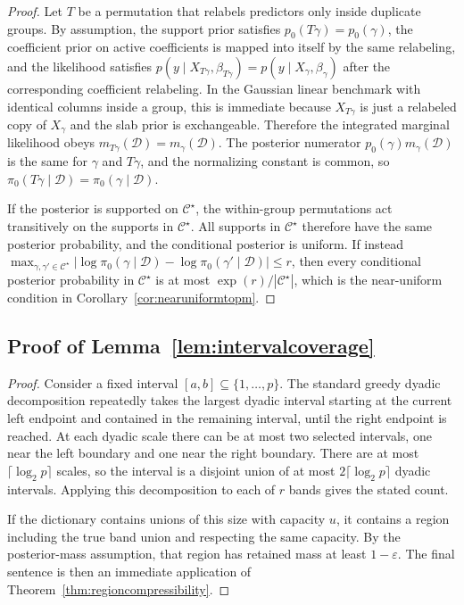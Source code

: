 \documentclass[twoside,11pt]{article}
\newcommand{\D}{\mathcal{D}}
\begin{document}
\begin{proof} Let \(T\) be a permutation that relabels predictors only inside duplicate groups. By assumption, the support prior satisfies \(p_0(T\gamma)=p_0(\gamma)\), the coefficient prior on active coefficients is mapped into itself by the same relabeling, and the likelihood satisfies \(p(y\mid X_{T\gamma},\beta_{T\gamma})=p(y\mid X_\gamma,\beta_\gamma)\) after the corresponding coefficient relabeling. In the Gaussian linear benchmark with identical columns inside a group, this is immediate because \(X_{T\gamma}\) is just a relabeled copy of \(X_\gamma\) and the slab prior is exchangeable. Therefore the integrated marginal likelihood obeys \(m_{T\gamma}(\D)=m_\gamma(\D)\). The posterior numerator \(p_0(\gamma)m_\gamma(\D)\) is the same for \(\gamma\) and \(T\gamma\), and the normalizing constant is common, so \(\pi_0(T\gamma\mid\D)=\pi_0(\gamma\mid\D)\).

If the posterior is supported on \(\mathcal C^\star\), the within-group permutations act transitively on the supports in \(\mathcal C^\star\). All supports in \(\mathcal C^\star\) therefore have the same posterior probability, and the conditional posterior is uniform. If instead \(\max_{\gamma,\gamma'\in\mathcal C^\star}|\log\pi_0(\gamma\mid\D)-\log\pi_0(\gamma'\mid\D)|\le r\), then every conditional posterior probability in \(\mathcal C^\star\) is at most \(\exp(r)/|\mathcal C^\star|\), which is the near-uniform condition in Corollary~\ref{cor:nearuniformtopm}.
\end{proof}

\subsection{Proof of Lemma~\ref{lem:intervalcoverage}}

\begin{proof} Consider a fixed interval \([a,b]\subseteq\{1,\dots,p\}\). The standard greedy dyadic decomposition repeatedly takes the largest dyadic interval starting at the current left endpoint and contained in the remaining interval, until the right endpoint is reached. At each dyadic scale there can be at most two selected intervals, one near the left boundary and one near the right boundary. There are at most \(\lceil\log_2 p\rceil\) scales, so the interval is a disjoint union of at most \(2\lceil\log_2 p\rceil\) dyadic intervals. Applying this decomposition to each of \(r\) bands gives the stated count.

If the dictionary contains unions of this size with capacity \(u\), it contains a region including the true band union and respecting the same capacity. By the posterior-mass assumption, that region has retained mass at least \(1-\varepsilon\). The final sentence is then an immediate application of Theorem~\ref{thm:regioncompressibility}.
\end{proof}
\end{document}
